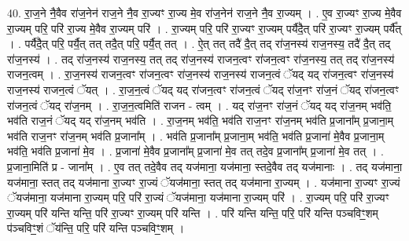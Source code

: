 \documentclass[17pt]{extarticle}
\begin{document}
40. रा॒ज॒ने नै॒वैव रा॑ज॒नेन॑ राज॒ने नै॒व रा॒ज्यꣳ रा॒ज्य मे॒व रा॑ज॒नेन॑ राज॒ने नै॒व रा॒ज्यम् । . ए॒व रा॒ज्यꣳ रा॒ज्य मे॒वैव रा॒ज्यम् परि॒ परि॑ रा॒ज्य मे॒वैव रा॒ज्यम् परि॑ । . रा॒ज्यम् परि॒ परि॑ रा॒ज्यꣳ रा॒ज्यम् पर्यै॑दै॒त् परि॑ रा॒ज्यꣳ रा॒ज्यम् पर्यै᳚त् । . पर्यै॑दै॒त् परि॒ पर्यै॒त् तत् तदै॒त् परि॒ पर्यै॒त् तत् । . ऐ॒त् तत् तदै॑ दै॒त् तद् रा॑ज॒नस्य॑ राज॒नस्य॒ तदै॑ दै॒त् तद् रा॑ज॒नस्य॑ । . तद् रा॑ज॒नस्य॑ राज॒नस्य॒ तत् तद् रा॑ज॒नस्य॑ राजन॒त्वꣳ रा॑जन॒त्वꣳ रा॑ज॒नस्य॒ तत् तद् रा॑ज॒नस्य॑ राजन॒त्वम् । . रा॒ज॒नस्य॑ राजन॒त्वꣳ रा॑जन॒त्वꣳ रा॑ज॒नस्य॑ राज॒नस्य॑ राजन॒त्वं ॅयद् यद् रा॑जन॒त्वꣳ रा॑ज॒नस्य॑ राज॒नस्य॑ राजन॒त्वं ॅयत् । . रा॒ज॒न॒त्वं ॅयद् यद् रा॑जन॒त्वꣳ रा॑जन॒त्वं ॅयद् रा॑ज॒नꣳ रा॑ज॒नं ॅयद् रा॑जन॒त्वꣳ रा॑जन॒त्वं ॅयद् रा॑ज॒नम् । . रा॒ज॒न॒त्वमिति॑ राजन - त्वम् । . यद् रा॑ज॒नꣳ रा॑ज॒नं ॅयद् यद् रा॑ज॒नम् भव॑ति॒ भव॑ति राज॒नं ॅयद् यद् रा॑ज॒नम् भव॑ति । . रा॒ज॒नम् भव॑ति॒ भव॑ति राज॒नꣳ रा॑ज॒नम् भव॑ति प्र॒जाना᳚म् प्र॒जाना॒म् भव॑ति राज॒नꣳ रा॑ज॒नम् भव॑ति प्र॒जाना᳚म् । . भव॑ति प्र॒जाना᳚म् प्र॒जाना॒म् भव॑ति॒ भव॑ति प्र॒जाना॑ मे॒वैव प्र॒जाना॒म् भव॑ति॒ भव॑ति प्र॒जाना॑ मे॒व । . प्र॒जाना॑ मे॒वैव प्र॒जाना᳚म् प्र॒जाना॑ मे॒व तत् तदे॒व प्र॒जाना᳚म् प्र॒जाना॑ मे॒व तत् । . प्र॒जाना॒मिति॑ प्र - जाना᳚म् । . ए॒व तत् तदे॒वैव तद् यज॑माना॒ यज॑माना॒ स्तदे॒वैव तद् यज॑मानाः । . तद् यज॑माना॒ यज॑माना॒ स्तत् तद् यज॑माना रा॒ज्यꣳ रा॒ज्यं ॅयज॑माना॒ स्तत् तद् यज॑माना रा॒ज्यम् । . यज॑माना रा॒ज्यꣳ रा॒ज्यं ॅयज॑माना॒ यज॑माना रा॒ज्यम् परि॒ परि॑ रा॒ज्यं ॅयज॑माना॒ यज॑माना रा॒ज्यम् परि॑ । . रा॒ज्यम् परि॒ परि॑ रा॒ज्यꣳ रा॒ज्यम् परि॑ यन्ति यन्ति॒ परि॑ रा॒ज्यꣳ रा॒ज्यम् परि॑ यन्ति । . परि॑ यन्ति यन्ति॒ परि॒ परि॑ यन्ति पञ्चविꣳ॒॒शम् प॑ञ्चविꣳ॒॒शं ॅय॑न्ति॒ परि॒ परि॑ यन्ति पञ्चविꣳ॒॒शम् । \newline
\end{document}
